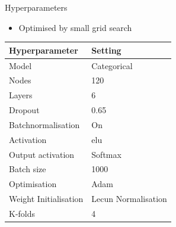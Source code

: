 \begin{frame}{Hyperparameters}
  \begin{itemize}
    \item Optimised by small grid search
  \end{itemize}
    \begin{table}[]
    \begin{tabular}{|l|l|}
    \hline
    Hyperparameter          &     Setting              \\ \hline
    Model                   &     Categorical          \\ \hline
    Nodes                   &     120                  \\ \hline
    Layers                  &     6                    \\ \hline
    Dropout                 &     0.65                 \\ \hline
    Batchnormalisation      &     On                   \\ \hline
    Activation              &     elu                  \\ \hline
    Output activation       &     Softmax              \\ \hline
    Batch size              &     1000                 \\ \hline
    Optimisation            &     Adam                 \\ \hline
    Weight Initialisation   &     Lecun Normalisation  \\ \hline
    K-folds                 &     4                    \\ \hline
    \end{tabular}
    \end{table}
\end{frame}

